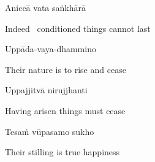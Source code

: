 \suttaRef{[Dhp 41]}

Aniccā vata saṅkhārā

\begin{english}
  Indeed \breathmark\ conditioned things cannot last
\end{english}

Uppāda-vaya-dhammino

\begin{english}
  Their nature is to rise and cease
\end{english}

Uppajjitvā nirujjhanti

\begin{english}
  Having arisen things must cease
\end{english}

Tesaṁ vūpasamo sukho

\begin{english}
  Their stilling is true happiness
\end{english}

\suttaRef{[Trad]}

\clearpage
